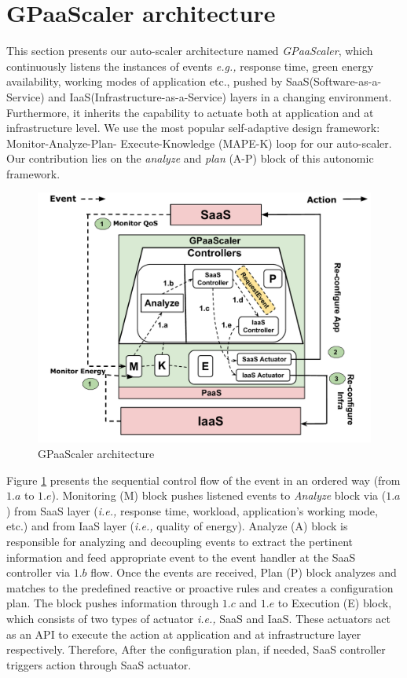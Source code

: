 \section{GPaaScaler architecture}

This section presents our auto-scaler architecture named \emph{GPaaScaler}, which continuously listens the instances of events \emph{e.g.,} response time, green energy availability, working modes of application etc., pushed by SaaS(Software-as-a-Service) and IaaS(Infrastructure-as-a-Service) layers in a changing environment. Furthermore, it inherits the capability to actuate both at application and at infrastructure level.
We use the most popular self-adaptive design framework: Monitor-Analyze-Plan-
Execute-Knowledge (MAPE-K) loop \cite{vision} for our auto-scaler.
Our contribution lies on the \emph{analyze} and \emph{plan} (A-P) block of this autonomic framework.


\begin{figure} [ht]
\centering
\includegraphics[scale=.35]{Graphs/test_gpaascaler.pdf}
\caption{GPaaScaler architecture}
\label{fig:GPaaScaler}
\end{figure}

Figure \ref{fig:GPaaScaler} presents the sequential control flow of the event in an ordered way (from $1.a$ to $1.e$). 
Monitoring (M) block pushes listened events to \emph{Analyze} block via ($1.a$) from SaaS layer (\emph{i.e.,} response time, workload, application's working mode, etc.) and from IaaS layer (\emph{i.e.,} quality of energy). Analyze (A) block is responsible for analyzing and decoupling events to extract the pertinent information and feed appropriate event to the event handler at the SaaS controller via $1.b$ flow. Once the events are 
received, Plan (P) block analyzes and matches to the predefined reactive or proactive rules and creates a
configuration plan. The block pushes information through $1.c$ and $1.e$ to
Execution (E) block, which consists of two types of actuator \emph{i.e.,} SaaS and IaaS. These actuators act as an API to execute the action at application and at infrastructure layer respectively.
Therefore, After the configuration plan, if needed, SaaS controller triggers action through SaaS actuator.

